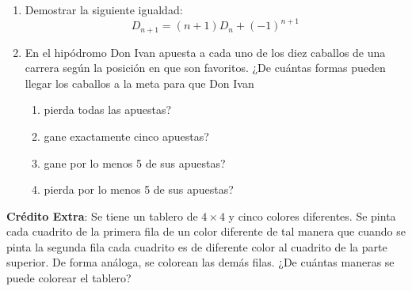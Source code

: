 \begin{enumerate}
	\item Demostrar la siguiente igualdad: \[D_{n+1}=(n+1)D_n+(-1)^{n+1}\]
    \item En el hipódromo Don Ivan apuesta a cada uno de los diez caballos de una carrera según la posición en que son favoritos. ¿De cuántas formas pueden llegar los caballos a la meta para que Don Ivan
    \begin{enumerate}
        \item pierda todas las apuestas?
        \item gane exactamente cinco apuestas?
        \item gane por lo menos 5 de sus apuestas?
        \item pierda por lo menos 5 de sus apuestas?
    \end{enumerate}

\end{enumerate}

\textbf{Crédito Extra}: Se tiene un tablero de $4 \times 4$ y cinco colores diferentes. Se pinta cada cuadrito de la primera fila de un color diferente de tal manera que cuando se pinta la segunda fila cada cuadrito es de diferente color al cuadrito de la parte superior. De forma análoga, se colorean las demás filas. ¿De cuántas maneras se puede colorear el tablero?